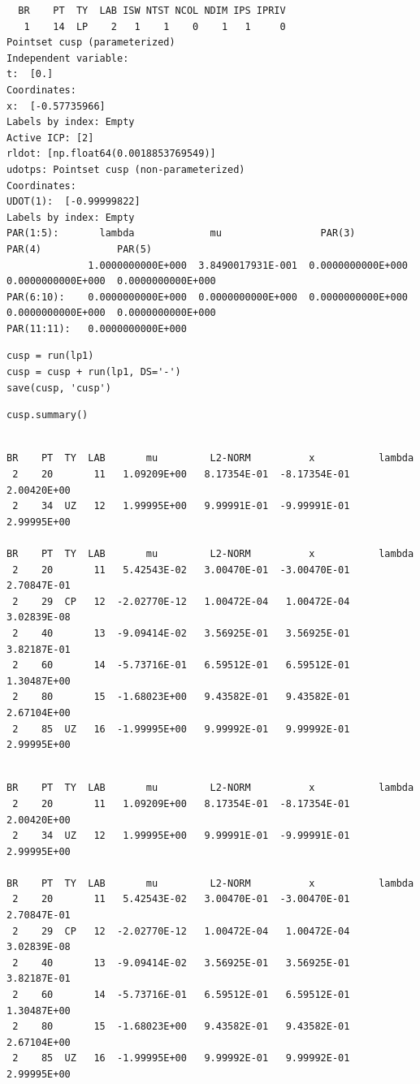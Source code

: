 \documentclass[11pt]{article}
\begin{document}
\begin{verbatim}
  BR    PT  TY  LAB ISW NTST NCOL NDIM IPS IPRIV
   1    14  LP    2   1    1    0    1   1     0
Pointset cusp (parameterized)
Independent variable:
t:  [0.]
Coordinates:
x:  [-0.57735966]
Labels by index: Empty
Active ICP: [2]
rldot: [np.float64(0.0018853769549)]
udotps: Pointset cusp (non-parameterized)
Coordinates:
UDOT(1):  [-0.99999822]
Labels by index: Empty
PAR(1:5):       lambda             mu                 PAR(3)             PAR(4)             PAR(5)         
              1.0000000000E+000  3.8490017931E-001  0.0000000000E+000  0.0000000000E+000  0.0000000000E+000
PAR(6:10):    0.0000000000E+000  0.0000000000E+000  0.0000000000E+000  0.0000000000E+000  0.0000000000E+000
PAR(11:11):   0.0000000000E+000
\end{verbatim}

\begin{verbatim}
cusp = run(lp1)
cusp = cusp + run(lp1, DS='-')
save(cusp, 'cusp')
\end{verbatim}


\begin{verbatim}
cusp.summary()
\end{verbatim}


\begin{verbatim}

BR    PT  TY  LAB       mu         L2-NORM          x           lambda    
 2    20       11   1.09209E+00   8.17354E-01  -8.17354E-01   2.00420E+00
 2    34  UZ   12   1.99995E+00   9.99991E-01  -9.99991E-01   2.99995E+00

BR    PT  TY  LAB       mu         L2-NORM          x           lambda    
 2    20       11   5.42543E-02   3.00470E-01  -3.00470E-01   2.70847E-01
 2    29  CP   12  -2.02770E-12   1.00472E-04   1.00472E-04   3.02839E-08
 2    40       13  -9.09414E-02   3.56925E-01   3.56925E-01   3.82187E-01
 2    60       14  -5.73716E-01   6.59512E-01   6.59512E-01   1.30487E+00
 2    80       15  -1.68023E+00   9.43582E-01   9.43582E-01   2.67104E+00
 2    85  UZ   16  -1.99995E+00   9.99992E-01   9.99992E-01   2.99995E+00
\end{verbatim}


\begin{verbatim}

BR    PT  TY  LAB       mu         L2-NORM          x           lambda    
 2    20       11   1.09209E+00   8.17354E-01  -8.17354E-01   2.00420E+00
 2    34  UZ   12   1.99995E+00   9.99991E-01  -9.99991E-01   2.99995E+00

BR    PT  TY  LAB       mu         L2-NORM          x           lambda    
 2    20       11   5.42543E-02   3.00470E-01  -3.00470E-01   2.70847E-01
 2    29  CP   12  -2.02770E-12   1.00472E-04   1.00472E-04   3.02839E-08
 2    40       13  -9.09414E-02   3.56925E-01   3.56925E-01   3.82187E-01
 2    60       14  -5.73716E-01   6.59512E-01   6.59512E-01   1.30487E+00
 2    80       15  -1.68023E+00   9.43582E-01   9.43582E-01   2.67104E+00
 2    85  UZ   16  -1.99995E+00   9.99992E-01   9.99992E-01   2.99995E+00
\end{verbatim}
\end{document}
